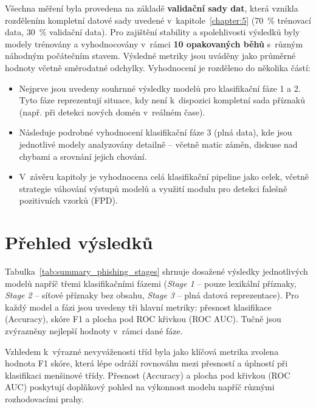 Všechna měření byla provedena na základě \textbf{validační sady dat}, která vznikla rozdělením kompletní datové sady uvedené v~kapitole~\ref{chapter:5} (70~\% trénovací data, 30~\% validační data). Pro zajištění stability a spolehlivosti výsledků byly modely trénovány a vyhodnocovány v~rámci \textbf{10 opakovaných běhů} s~různým náhodným počátečním stavem. Výsledné metriky jsou uváděny jako průměrné hodnoty včetně směrodatné odchylky. Vyhodnocení je rozděleno do několika částí:
\begin{itemize}
    \item Nejprve jsou uvedeny souhrnné výsledky modelů pro klasifikační fáze 1 a 2. Tyto fáze reprezentují situace, kdy není k~dispozici kompletní sada příznaků (např. při detekci nových domén v~reálném čase).
    \item Následuje podrobné vyhodnocení klasifikační fáze 3 (plná data), kde jsou jednotlivé modely analyzovány detailně – včetně matic záměn, diskuse nad chybami a srovnání jejich chování.
    \item V~závěru kapitoly je vyhodnocena celá klasifikační pipeline jako celek, včetně strategie váhování výstupů modelů a využití modulu pro detekci falešně pozitivních vzorků (FPD).
\end{itemize}

\section{Přehled výsledků}

Tabulka~\ref{tab:summary_phishing_stages} shrnuje dosažené výsledky jednotlivých modelů napříč třemi klasifikačními fázemi (\textit{Stage 1} – pouze lexikální příznaky, \textit{Stage 2} – síťové příznaky bez obsahu, \textit{Stage 3} – plná datová reprezentace). Pro každý model a fázi jsou uvedeny tři hlavní metriky: přesnost klasifikace (Accuracy), skóre F1 a plocha pod ROC křivkou (ROC AUC). Tučně jsou zvýrazněny nejlepší hodnoty v~rámci dané fáze.

Vzhledem k~výrazné nevyváženosti tříd byla jako klíčová metrika zvolena hodnota F1 skóre, která lépe odráží rovnováhu mezi přesností a úplností při klasifikaci menšinové třídy. Přesnost (Accuracy) a plocha pod křivkou (ROC AUC) poskytují doplňkový pohled na výkonnost modelu napříč různými rozhodovacími prahy.


